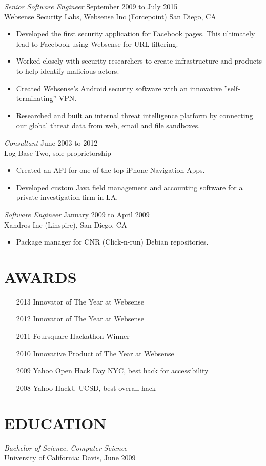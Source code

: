 \documentclass[margin]{res}
\begin{document}
\begin{resume}
{\sl Senior Software Engineer} \hfill September 2009 to July 2015 \\
Websense Security Labs, Websense Inc (Forcepoint) San Diego, CA
\begin{itemize} \itemsep -2pt
  \item Developed the first security application for Facebook pages. This ultimately lead to Facebook using Websense for URL filtering.
  \item Worked closely with security researchers to create infrastructure and products to help identify malicious actors.
  \item Created Websense's Android security software with an innovative ''self-terminating'' VPN.
  \item Researched and built an internal threat intelligence platform by connecting our global threat data from web, email and file sandboxes.
\end{itemize}

{\sl Consultant} \hfill  June 2003 to 2012 \\
Log Base Two, sole proprietorship
\begin{itemize}  \itemsep -2pt %
  \item Created an API for one of the top iPhone Navigation Apps.
  \item Developed custom Java field management and accounting software for a private investigation firm in LA.
\end{itemize}
        
{\sl Software Engineer} \hfill  January 2009 to April 2009 \\
Xandros Inc (Linspire), San Diego, CA
\begin{itemize}  \itemsep -2pt %
  \item Package manager for CNR (Click-n-run) Debian repositories.
\end{itemize}

\section{AWARDS}
\begin{itemize} \itemsep -2pt
  \item[2013]{Innovator of The Year at Websense}
  \item[2012]{Innovator of The Year at Websense}
  \item[2011]{Foursquare Hackathon Winner}
  \item[2010]{Innovative Product of The Year at Websense}
  \item[2009]{Yahoo Open Hack Day NYC, best hack for accessibility} 
  \item[2008]{Yahoo HackU UCSD, best overall hack}
\end{itemize}
\section{EDUCATION} {\sl Bachelor of Science, Computer Science}\\
        University of California: Davis, June 2009\\

\end{resume}
\end{document}

